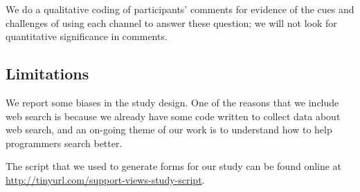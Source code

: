  We do a qualitative coding of participants' comments for evidence of the cues and challenges of using each channel to answer these question; we will not look for quantitative significance in comments.

 \subsection{Limitations}

 We report some biases in the study design.
 One of the reasons that we include web search is because we already have some code written to collect data about web search, and an on-going theme of our work is to understand how to help programmers search better.

 The script that we used to generate forms for our study can be found online at \url{http://tinyurl.com/support-views-study-script}.
